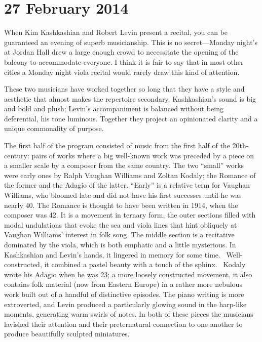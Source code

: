 \chapter{27 February 2014}

When Kim Kashkashian and Robert Levin present a recital, you can be guaranteed an evening of superb musicianship. This is no secret—Monday night’s at Jordan Hall drew a large enough crowd to necessitate the opening of the balcony to accommodate everyone. I think it is fair to say that in most other cities a Monday night viola recital would rarely draw this kind of attention.

These two musicians have worked together so long that they have a style and aesthetic that almost makes the repertoire secondary. Kashkashian’s sound is big and bold and plush; Levin’s accompaniment is balanced without being deferential, his tone luminous. Together they project an opinionated clarity and a unique commonality of purpose.

The first half of the program consisted of music from the first half of the 20th-century: pairs of works where a big well-known work was preceded by a piece on a smaller scale by a composer from the same country. The two “small” works were early ones by Ralph Vaughan Williams and Zoltan Kodaly; the Romance of the former and the Adagio of the latter. “Early” is a relative term for Vaughan Williams, who bloomed late and did not have his first successes until he was nearly 40. The Romance is thought to have been written in 1914, when the composer was 42. It is a movement in ternary form, the outer sections filled with modal undulations that evoke the sea and viola lines that hint obliquely at Vaughan Williams’ interest in folk song. The middle section is a recitative dominated by the viola, which is both emphatic and a little mysterious. In Kashkashian and Levin’s hands, it lingered in memory for some time.  Well-constructed, it combined a pastel beauty with a touch of the sphinx.  Kodaly wrote his Adagio when he was 23; a more loosely constructed movement, it also contains folk material (now from Eastern Europe) in a rather more nebulous work built out of a handful of distinctive episodes. The piano writing is more extroverted, and Levin produced a particularly glowing sound in the harp-like moments, generating warm swirls of notes. In both of these pieces the musicians lavished their attention and their preternatural connection to one another to produce beautifully sculpted miniatures.

